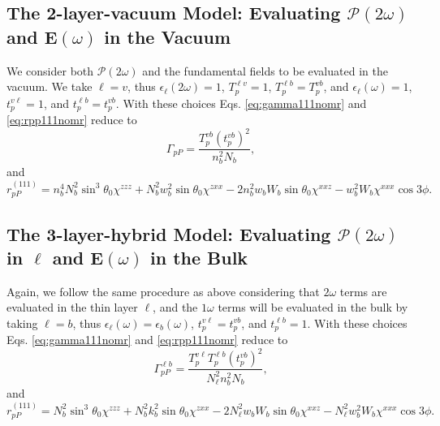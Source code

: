 
\subsection{The 2-layer-vacuum Model: Evaluating
\texorpdfstring{$\boldsymbol{\mathcal{P}}(2\omega)$}{P(2w)} and
\texorpdfstring{$\mathbf{E}(\omega)$}{E(w)} in the Vacuum}
\label{sec:2-layer-vacuum}

We consider both $\boldsymbol{\mathcal{P}}(2\omega)$ and the fundamental fields
to be evaluated in the vacuum. We take $\ell = v$, thus
$\epsilon_{\ell}(2\omega) = 1$, $T^{\ell v}_{p} = 1$, $T^{\ell b}_{p} =
T^{vb}_{p}$, and $\epsilon_{\ell}(\omega) = 1$, $t^{v\ell}_{p} = 1$, and
$t^{\ell b}_{p} = t^{vb}_{p}$. With these choices Eqs. \eqref{eq:gamma111nomr}
and \eqref{eq:rpp111nomr} reduce to
\begin{equation}
\Gamma_{pP} =
\frac{T^{v b}_{p}\left(t^{v b}_{p}\right)^{2}}{n^{2}_{b}N_{b}},
\end{equation}
and
\begin{equation}
r^{(111)}_{pP} =
  n^{4}_{b}N^{2}_{b}\sin^{3}\theta_{0}\chi^{zzz}
+ N^{2}_{b}w^{2}_{b}\sin\theta_{0}\chi^{zxx}
- 2n^{2}_{b}w_{b}W_{b}\sin\theta_{0}\chi^{xxz}
- w^{2}_{b}W_{b}\chi^{xxx}\cos3\phi.
\end{equation}



\subsection{The 3-layer-hybrid Model: Evaluating
\texorpdfstring{$\boldsymbol{\mathcal{P}}(2\omega)$ in $\ell$}{P(2w) in l} and
\texorpdfstring{$\mathbf{E}(\omega)$}{E(w)} in the Bulk}
\label{sec:3-layer-hybrid}

Again, we follow the same procedure as above considering that $2\omega$ terms
are evaluated in the thin layer $\ell$, and the $1\omega$ terms will be
evaluated in the bulk by taking $\ell = b$, thus $\epsilon_{\ell}(\omega) =
\epsilon_{b}(\omega)$, $t^{v\ell}_{p} = t^{vb}_{p}$, and $t^{\ell b}_{p} = 1$.
With these choices Eqs. \eqref{eq:gamma111nomr} and \eqref{eq:rpp111nomr} reduce
to
\begin{equation}
\Gamma^{\ell b}_{pP}=
\frac{T^{v\ell}_{p}T^{\ell b}_{p}\left(t^{vb}_{p}\right)^{2}}
  {N^{2}_{\ell}n^{2}_{b}N_{b}},
\end{equation}
and
\begin{equation}
r^{(111)}_{pP} = 
  N^{2}_{b}\sin^{3}\theta_{0}\chi^{zzz}
+ N^{2}_{b}k^{2}_{b}\sin\theta_{0}\chi^{zxx}
- 2N^{2}_{\ell}w_{b}W_{b}\sin\theta_{0}\chi^{xxz}
- N^{2}_{\ell}w^{2}_{b}W_{b}\chi^{xxx}\cos3\phi.
\end{equation}


